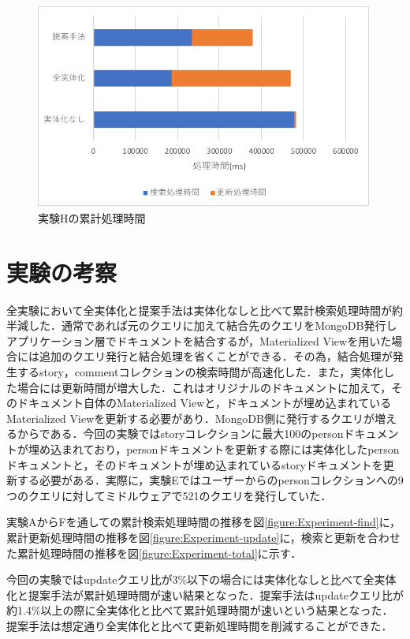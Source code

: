 \documentclass[a4paper,11pt]{ujreport}
\begin{document}
\begin{figure}[htbp]
	\begin{center}
		\includegraphics[width=30em]{src/ExperimentH-total.pdf} %
	\end{center}
	\caption{実験Hの累計処理時間}
	\label{figure:ExperimentH-total}
\end{figure}

\section{実験の考察}
\label{sec:Consideration}

全実験において全実体化と提案手法は実体化なしと比べて累計検索処理時間が約半減した．通常であれば元のクエリに加えて結合先のクエリをMongoDB発行しアプリケーション層でドキュメントを結合するが，Materialized Viewを用いた場合には追加のクエリ発行と結合処理を省くことができる．その為，結合処理が発生するstory，commentコレクションの検索時間が高速化した．また，実体化した場合には更新時間が増大した．これはオリジナルのドキュメントに加えて，そのドキュメント自体のMaterialized Viewと，ドキュメントが埋め込まれているMaterialized Viewを更新する必要があり．MongoDB側に発行するクエリが増えるからである．今回の実験ではstoryコレクションに最大100のpersonドキュメントが埋め込まれており，personドキュメントを更新する際には実体化したpersonドキュメントと，そのドキュメントが埋め込まれているstoryドキュメントを更新する必要がある．実際に，実験Eではユーザーからのpersonコレクションへの9つのクエリに対してミドルウェアで521のクエリを発行していた．

実験AからFを通しての累計検索処理時間の推移を図\ref{figure:Experiment-find}に，累計更新処理時間の推移を図\ref{figure:Experiment-update}に，検索と更新を合わせた累計処理時間の推移を図\ref{figure:Experiment-total}に示す．

今回の実験ではupdateクエリ比が3\%以下の場合には実体化なしと比べて全実体化と提案手法が累計処理時間が速い結果となった．提案手法はupdateクエリ比が約1.4\%以上の際に全実体化と比べて累計処理時間が速いという結果となった．提案手法は想定通り全実体化と比べて更新処理時間を削減することができた．
\end{document}
